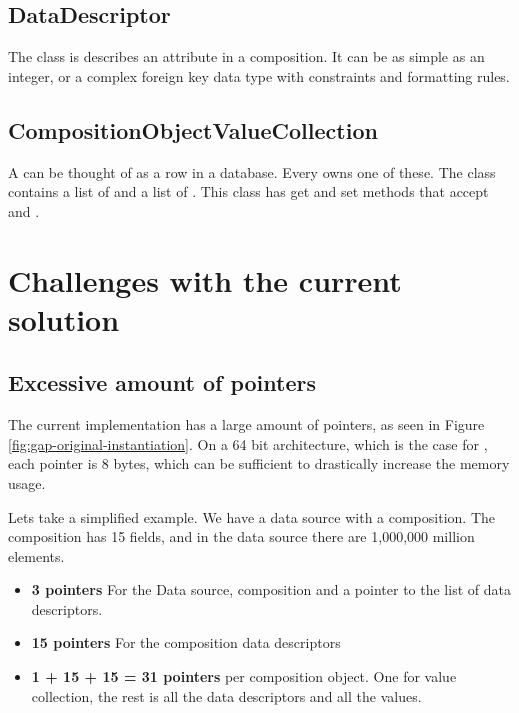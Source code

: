 \subsection{DataDescriptor}
\label{sub:DataDescriptor}
The  class is describes an attribute in a composition. It can be as simple as an integer, or a complex foreign key data type with constraints and formatting rules.

\subsection{CompositionObjectValueCollection}
\label{sub:CompositionObjectValueCollection}
A  can be thought of as a row in a database. Every  owns one of these. The class contains a list of  and a list of . This class has get and set methods that accept  and .

\section{Challenges with the current solution}
\label{sec:Challenges with the current solution}

\subsection{Excessive amount of pointers}
\label{sub:Excessive amount of pointers}
The current implementation has a large amount of pointers, as seen in Figure \ref{fig:gap-original-instantiation}. On a 64 bit architecture, which is the case for \gap, each pointer is 8 bytes, which can be sufficient to drastically increase the memory usage.

Lets take a simplified example. We have a data source with a composition. The composition has 15 fields, and in the data source there are 1,000,000 million elements.
\begin{itemize}
    \item \textbf{3 pointers} For the Data source, composition and a pointer to the list of data descriptors.
    \item \textbf{15 pointers} For the composition data descriptors
    \item \textbf{1 + 15 + 15 = 31 pointers} per composition object. One for value collection, the rest is all the data descriptors and all the values.
\end{itemize}


